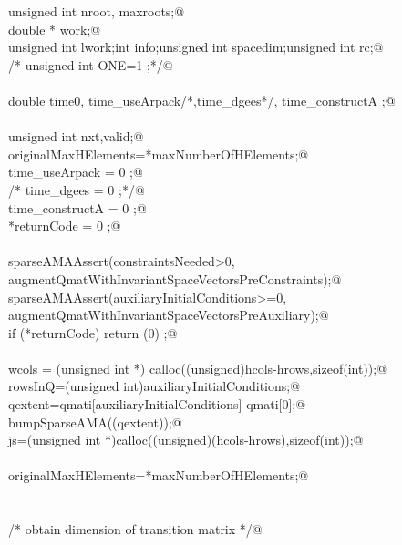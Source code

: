 \documentclass[12pt]{article}
\begin{document}
\begin{flushleft}
\begin{minipage}{\linewidth}
\begin{list}{}{}
\mbox{}\verb@        unsigned int nroot, maxroots;@\\
\mbox{}\verb@        double * work;@\\
\mbox{}\verb@        unsigned int lwork;int info;unsigned int spacedim;unsigned int rc;@\\
\mbox{}\verb@/*      unsigned int ONE=1 ;*/@\\
\mbox{}\verb@@\\
\mbox{}\verb@        double time0, time_useArpack/*,time_dgees*/, time_constructA ;@\\
\mbox{}\verb@@\\
\mbox{}\verb@        unsigned int nxt,valid;@\\
\mbox{}\verb@        originalMaxHElements=*maxNumberOfHElements;@\\
\mbox{}\verb@        time_useArpack = 0 ;@\\
\mbox{}\verb@/*      time_dgees = 0 ;*/@\\
\mbox{}\verb@        time_constructA = 0 ;@\\
\mbox{}\verb@        *returnCode = 0 ;@\\
\mbox{}\verb@@\\
\mbox{}\verb@        sparseAMAAssert(constraintsNeeded>0, augmentQmatWithInvariantSpaceVectorsPreConstraints);@\\
\mbox{}\verb@    sparseAMAAssert(auxiliaryInitialConditions>=0, augmentQmatWithInvariantSpaceVectorsPreAuxiliary);@\\
\mbox{}\verb@        if (*returnCode) return (0) ;@\\
\mbox{}\verb@@\\
\mbox{}\verb@    wcols = (unsigned int *) calloc((unsigned)hcols-hrows,sizeof(int));@\\
\mbox{}\verb@    rowsInQ=(unsigned int)auxiliaryInitialConditions;@\\
\mbox{}\verb@        qextent=qmati[auxiliaryInitialConditions]-qmati[0];@\\
\mbox{}\verb@        bumpSparseAMA((qextent));@\\
\mbox{}\verb@        js=(unsigned int *)calloc((unsigned)(hcols-hrows),sizeof(int));@\\
\mbox{}\verb@@\\
\mbox{}\verb@        originalMaxHElements=*maxNumberOfHElements;@\\
\mbox{}\verb@@\\
\mbox{}\verb@@\\
\mbox{}\verb@        /* obtain dimension of transition matrix */@\\

\end{list}
\end{minipage}
\end{flushleft}
\end{document}
